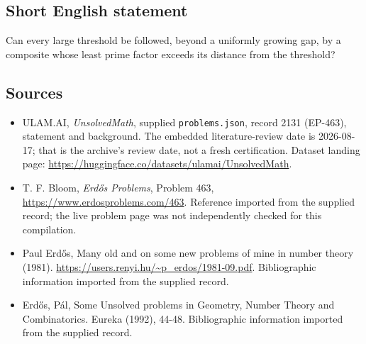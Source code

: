 \documentclass[11pt,a4paper]{article}
\begin{document}
\subsection{Short English statement}

Can every large threshold be followed, beyond a uniformly growing gap, by a composite whose least prime factor exceeds its distance from the threshold?

\subsection{Sources}

{\small

\begin{itemize}

\item[\hypertarget{source:2131:1}{S1}] ULAM.AI, \emph{UnsolvedMath}, supplied \texttt{problems.json}, record 2131 (EP-463), statement and background. The embedded literature-review date is 2026-08-17; that is the archive’s review date, not a fresh certification. Dataset landing page: \url{https://huggingface.co/datasets/ulamai/UnsolvedMath}.

\item[\hypertarget{source:2131:2}{S2}] T. F. Bloom, \emph{Erdős Problems}, Problem 463, \url{https://www.erdosproblems.com/463}. Reference imported from the supplied record; the live problem page was not independently checked for this compilation.

\item[\hypertarget{source:2131:3}{S3}] Paul Erdős, Many old and on some new problems of mine in number theory (1981). \url{https://users.renyi.hu/~p_erdos/1981-09.pdf}. Bibliographic information imported from the supplied record.

\item[\hypertarget{source:2131:4}{S4}] Erd\H{o}s, P\'{a}l, Some Unsolved problems in Geometry, Number Theory and Combinatorics. Eureka (1992), 44-48. Bibliographic information imported from the supplied record.

\end{itemize}

}

\label{end:2131}
\end{document}
